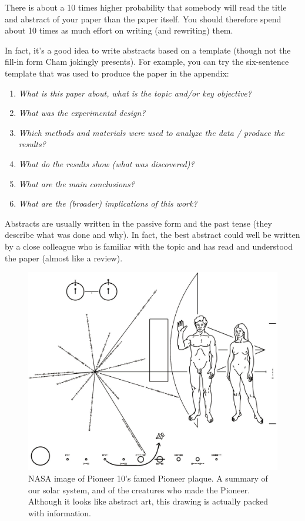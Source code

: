 \documentclass[graybox,envcountchap,sectrefs,UStrade]{svmono}
\begin{document}
\begin{svgraybox}
There is about a 10 times higher probability that somebody will read the title and abstract of your paper than the paper itself. You should therefore spend about 10 times as much effort on writing (and rewriting) them.
\end{svgraybox}

In fact, it's a good idea to write abstracts based on a template (though not the fill-in form Cham jokingly presents). For example, you can try the six-sentence template that was used to produce the paper in the appendix:

\begin{enumerate}
  \item \emph{What is this paper about, what is the topic and/or key objective?}
  \item \emph{What was the experimental design?}
  \item \emph{Which methods and materials were used to analyze the data / produce the results?}
  \item \emph{What do the results show (what was discovered)?}
  \item \emph{What are the main conclusions?}
  \item \emph{What are the (broader) implications of this work?}
\end{enumerate}

Abstracts are usually written in the passive form and the past tense (they describe what was done and why). In fact, the best abstract could well be written by a close colleague who is familiar with the topic and has read and understood the paper (almost like a review).\par

\begin{figure}[!htb]
\begin{center}
  \includegraphics[width=\textwidth]{Pioneer_plaque.jpg}
\caption{NASA image of Pioneer 10's famed Pioneer plaque. A summary of our solar system, and of the creatures who made the Pioneer. Although it looks like abstract art, this drawing is actually packed with information.} \label{Fig:Pioneer_plaque}
\end{center}
\end{figure}
\end{document}
